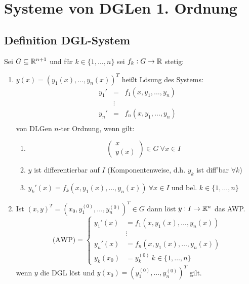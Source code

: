 \section{Systeme von DGLen 1. Ordnung}
\subsection{Definition DGL-System}
Sei $G \subseteq \mathbb{R}^{n+1}$ und für $k \in \{1, \ldots, n\}$ sei $f_k: G \to \mathbb{R}$ stetig:
\begin{enumerate}[label= (\alph*)]
	\item $y(x) = (y_1(x), \ldots, y_n(x))^T$ heißt Lösung des Systems:
		\begin{eqnarray*}
			y_1' &=& f_1(x, y_1, \ldots, y_n) \\
			&\vdots& \\
			y_n' &=& f_n(x, y_1, \ldots, y_n) \\
		\end{eqnarray*}
		von DLGen $n$-ter Ordnung, wenn gilt:
		\begin{enumerate}
			\item 
				\begin{equation*}
					\begin{pmatrix}
						x \\ y(x)
					\end{pmatrix} \in G\ \forall x \in I
				\end{equation*} 
			\item $y$ ist differentierbar auf $I$ (Komponentenweise, d.h. $y_k$ ist diff'bar $\forall k$)
			\item $y_k'(x) = f_k(x, y_1(x), \ldots, y_n(x))\ \forall x \in I$ und bel. $k\in\{1, \ldots, n\}$ 
		\end{enumerate}
	\item Ist $(x,y)^T = (x_0, y_1^{(0)}, \ldots, y_n^{(0)})^T \in G$ dann löst $y: I \to \mathbb{R}^n$ das AWP.
		\begin{equation*}
			\text{(AWP)} = 
			\begin{cases}
				y_1'(x) &= f_1(x, y_1(x), \ldots, y_n(x)) \\
				&\vdots \\
				y_n'(x) &= f_n(x, y_1(x), \ldots, y_n(x))\\
				y_k(x_0) &= y_k^{(0)}\ k \in \{1, \ldots, n\}
			\end{cases}
		\end{equation*} 
		wenn $y$ die DGL löst und $y(x_0)=(y_1^{(0)}, \ldots,y_n^{(0)})^T$ gilt.
\end{enumerate}

